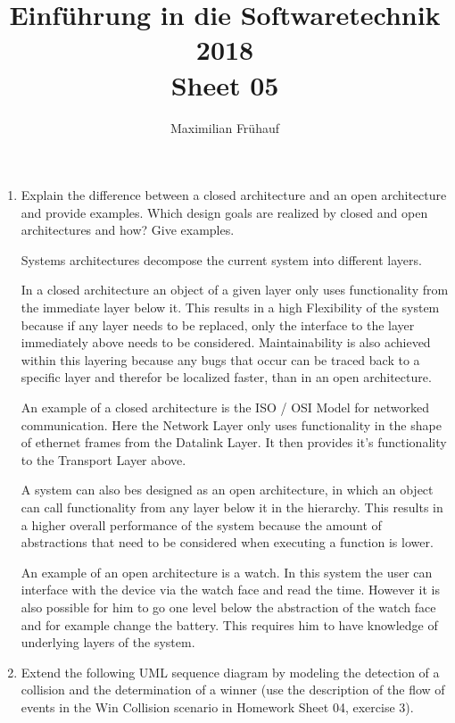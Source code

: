\documentclass[a4paper, 10pt]{article}
\title{Einführung in die Softwaretechnik 2018 \\ Sheet 05}
\author{Maximilian Frühauf}
\begin{document}
\maketitle
\begin{enumerate}
    \item 
    Explain the difference between a closed architecture and an open
    architecture and provide examples. Which design goals are realized by closed and
    open architectures and how? Give examples.
    \vspace{0.5cm}

    Systems architectures decompose the current system into different layers. 

    In a closed architecture an object of a  given layer only uses functionality from the immediate layer below it.
    This results in a high Flexibility of the system because if any layer needs to be replaced,
    only the interface to the layer immediately above needs to be considered. 
    Maintainability is also achieved within this layering because any bugs that occur can be traced back
    to a specific layer and therefor be localized faster, than in an open architecture.

    An example of a closed architecture is the ISO / OSI Model for networked communication. 
    Here the Network Layer only uses functionality in the shape of ethernet frames from the Datalink Layer.
    It then provides it's functionality to the Transport Layer above. 
    \vspace{0.5cm}

    A system can also bes designed as an open architecture, in which an object can call functionality from any
    layer below it in the hierarchy. 
    This results in a higher overall performance of the system because the amount of abstractions 
    that need to be considered when executing a function is lower.

    An example of an open architecture is a watch. In this system the user can interface with the device
    via the watch face and read the time. However it is also possible for him to go one level below the abstraction
    of the watch face and for example change the battery. This requires him to have knowledge of underlying layers 
    of the system.

    \item
    Extend the following UML sequence diagram by modeling the detection of a
    collision and the determination of a winner (use the description of the flow of events in
    the Win Collision scenario in Homework Sheet 04, exercise 3).
    \vspace{0.5cm}


\end{enumerate}
\end{document}
